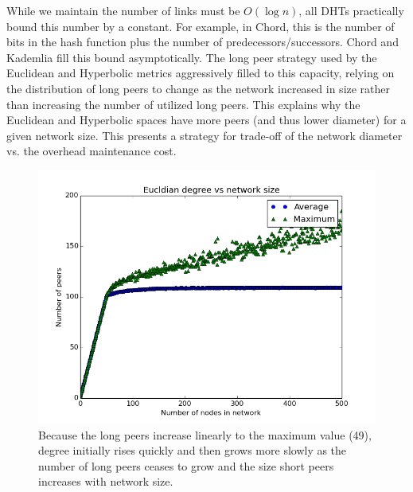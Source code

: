 While we maintain the number of links must be $ O(\log n)$, all DHTs practically bound this number by a constant.  
For example, in Chord, this is the number of bits in the hash function plus the number of predecessors/successors.
Chord and Kademlia fill this bound asymptotically. 
The long peer strategy used by the Euclidean and Hyperbolic metrics aggressively filled to this capacity, relying on the distribution of long peers to change as the network increased in size rather than increasing the number of utilized long peers.
This explains why the Euclidean and Hyperbolic spaces have more peers (and thus lower diameter) for a given network size.
This presents a strategy for trade-off of the network diameter vs. the overhead maintenance cost.




\begin{figure}
\centering
\includegraphics[width=0.75\linewidth]{figs/EucldianDegree}
\caption{Because the long peers increase linearly to the maximum value (49), degree initially rises quickly and then grows  more slowly as the number of long peers ceases to grow and the size short peers increases with network size. }
\label{fig:EucldianDegree}
\end{figure}

